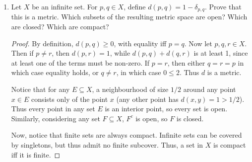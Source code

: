 \begin{enumerate}
\begin{enumerate}[(a)]
\begin{proof}
Now let $y \in \overline{E^c}$. If $y \in E^c$, then $y \not\in E^\circ \subseteq E$. If $y \in {E^c}'$, then every neighbourhood of $y$ contains an element of $E^c$, and thus no neighbourhood of $y$ is completely contained in $E$, so $y \not\in E^\circ$.
\end{proof}

\item Do $E$ and $\overline{E}$ always have the same interiors?
\begin{proof}
No: let $A = \{1/n : n \in \N\} \cup \{0\}$ be a subset of $\R$ and let $E = A^c$ . Then, $\overline{E} = \R$ so its interior is $\R$. However, 0 is not an interior point of $E$: every neighbourhood contains at least one point $1/n$ not in $E$. 
\end{proof}

\item Do $E$ and $E^\circ$ always have the same closures?
\begin{proof}
No: consider $E = \Q$. Then $\overline{E} = \R$ and $E^\circ = \emptyset$, whose closure is also empty.
\end{proof}
\end{enumerate}

\item %
Let $X$ be an infinite set. For $p, q \in X$, define $d(p, q) = 1 - \delta_{p, q}$. Prove that this is a metric. Which subsets of the resulting metric space are open? Which are closed? Which are compact?

\begin{proof}
By definition, $d(p, q) \ge 0$, with equality iff $p = q$. Now let $p, q, r \in X$. Then if $p \ne r$, then $d(p, r) = 1$, while $d(p, q) + d(q, r)$ is at least 1, since at least one of the terms must be non-zero. If $p = r$, then either $q = r = p$ in which case equality holds, or $q \ne r$, in which case $0 \le 2$. Thus $d$ is a metric.

Notice that for any $E \subseteq X$, a neighbourhood of size $1/2$ around any point $x \in E$ consists only of the point $x$ (any other point has $d(x, y) = 1 > 1/2$). Thus every point in any set $E$ is an interior point, so every set is open. Similarly, considering any set $F \subseteq X$, $F^c$ is open, so $F$ is closed. 

Now, notice that finite sets are always compact. Infinite sets can be covered by singletons, but thus admit no finite subcover. Thus, a set in $X$ is compact iff it is finite. 
\end{proof}


\end{enumerate}
